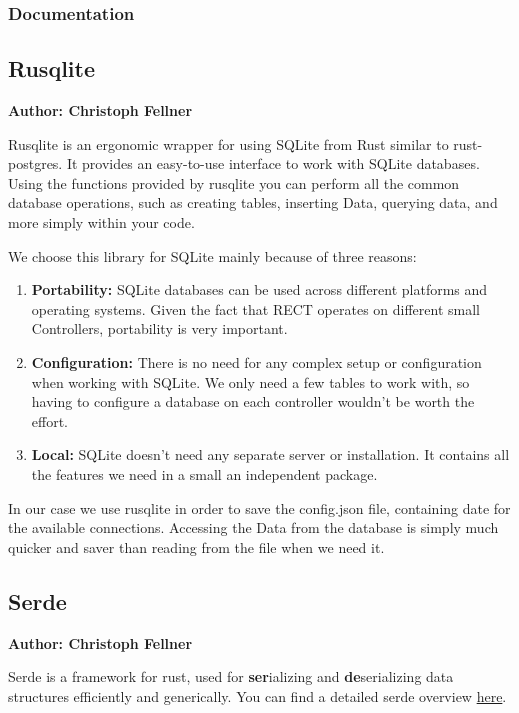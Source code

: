 \subsubsection{Documentation}

\subsection{Rusqlite}
\textbf{Author: Christoph Fellner}

Rusqlite is an ergonomic wrapper for using SQLite from Rust similar to rust-postgres. It provides an easy-to-use interface to work with SQLite databases. Using the functions provided by rusqlite you can perform all the common database operations, such as creating tables, inserting Data, querying data, and more simply within your code. 

We choose this library for SQLite mainly because of three reasons:
\begin{enumerate}
    \item \textbf{Portability:} SQLite databases can be used across different platforms and operating systems. Given the fact that RECT operates on different small Controllers, portability is very important.
    \item \textbf{Configuration:} There is no need for any complex setup or configuration when working with SQLite. We only need a few tables to work with, so having to configure a database on each controller wouldn't be worth the effort.
    \item \textbf{Local:} SQLite doesn't need any separate server or installation. It contains all the features we need in a small an independent package.
\end{enumerate}

In our case we use rusqlite in order to save the config.json file, containing date for the available connections. Accessing the Data from the database is simply much quicker and saver than reading from the file when we need it. 

\subsection{Serde}
\textbf{Author: Christoph Fellner}

Serde is a framework for rust, used for \textbf{ser}ializing and \textbf{de}serializing data structures efficiently and generically. You can find a detailed serde overview \href{https://serde.rs/}{here}.

